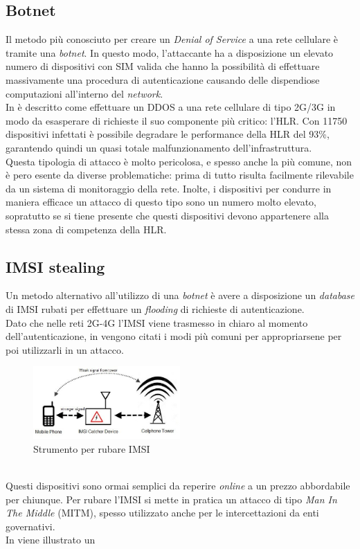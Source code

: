 \subsection{Botnet}
Il metodo più conosciuto per creare un \textit{Denial of Service} a una rete cellulare è tramite una \textit{botnet}.
In questo modo, l'attaccante ha a disposizione un elevato numero di dispositivi con SIM valida che hanno la possibilità di effettuare massivamente una procedura
di autenticazione causando delle dispendiose computazioni all'interno del \textit{network}.\\
In \cite{measuring-dos} è descritto come effettuare un DDOS a una rete cellulare di tipo 2G/3G in modo da esasperare di richieste il suo componente più critico: l'HLR.
Con 11750 dispositivi infettati è possibile degradare le performance della HLR del 93\%\cite{measuring-dos}, garantendo quindi un quasi totale malfunzionamento dell'infrastruttura.\\
Questa tipologia di attacco è molto pericolosa, e spesso anche la più comune, non è pero esente da diverse problematiche: prima di tutto risulta facilmente rilevabile da un sistema di 
monitoraggio della rete. Inolte, i dispositivi per condurre in maniera efficace un attacco di questo tipo sono un numero molto elevato, sopratutto se si tiene presente che questi dispositivi devono 
appartenere alla stessa zona di competenza della HLR.\\

\subsection{IMSI stealing}
Un metodo alternativo all'utilizzo di una \textit{botnet} è avere a disposizione un \textit{database} di IMSI rubati per effettuare un \textit{flooding} di richieste di autenticazione.\\
Dato che nelle reti 2G-4G l'IMSI viene trasmesso in chiaro al momento dell'autenticazione, in \cite{imsi-catcher} vengono citati i modi più comuni per appropriarsene per poi utilizzarli in un 
attacco.
\begin{figure}[h]
    \centering
    \includegraphics[width=0.5\textwidth]{images/imsi-catcher.jpg}
    \caption{Strumento per rubare IMSI}
\end{figure}\\
Questi dispositivi sono ormai semplici da reperire \textit{online} a un prezzo abbordabile per chiunque. Per rubare l'IMSI si mette in pratica un attacco di tipo \textit{Man In The Middle} (MITM), spesso utilizzato
anche per le intercettazioni da enti governativi.\\
In \cite{dos-imsi} viene illustrato un 



